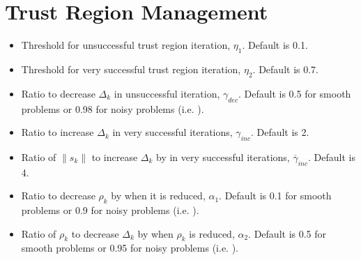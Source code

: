 \documentclass[letterpaper,10pt,english]{sphinxmanual}
\begin{document}
\section{Trust Region Management}
\label{\detokenize{advanced:trust-region-management}}\begin{itemize}
\item {} 
\sphinxAtStartPar
{} \sphinxhyphen{} Threshold for unsuccessful trust region iteration, \(\eta_1\). Default is 0.1.

\item {} 
\sphinxAtStartPar
{} \sphinxhyphen{} Threshold for very successful trust region iteration, \(\eta_2\). Default is 0.7.

\item {} 
\sphinxAtStartPar
{} \sphinxhyphen{} Ratio to decrease \(\Delta_k\) in unsuccessful iteration, \(\gamma_{dec}\). Default is 0.5 for smooth problems or 0.98 for noisy problems (i.e. ).

\item {} 
\sphinxAtStartPar
{} \sphinxhyphen{} Ratio to increase \(\Delta_k\) in very successful iterations, \(\gamma_{inc}\). Default is 2.

\item {} 
\sphinxAtStartPar
{} \sphinxhyphen{} Ratio of \(\|s_k\|\) to increase \(\Delta_k\) by in very successful iterations, \(\overline{\gamma}_{inc}\). Default is 4.

\item {} 
\sphinxAtStartPar
{} \sphinxhyphen{} Ratio to decrease \(\rho_k\) by when it is reduced, \(\alpha_1\). Default is 0.1 for smooth problems or 0.9 for noisy problems (i.e. ).

\item {} 
\sphinxAtStartPar
{} \sphinxhyphen{} Ratio of \(\rho_k\) to decrease \(\Delta_k\) by when \(\rho_k\) is reduced, \(\alpha_2\). Default is 0.5 for smooth problems or 0.95 for noisy problems (i.e. ).

\end{itemize}
\end{document}
